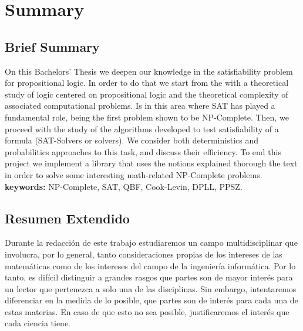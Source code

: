 
\newpage



\chapter*{Summary}
\section*{Brief Summary}

On this Bachelors' Thesis we deepen our knowledge in the satisfiability problem for propositional logic. In order to do that we start from the with a theoretical study of logic centered on propositional logic and the theoretical complexity of associated computational problems. Is in this area where SAT has played a fundamental role, being the first problem shown to be NP-Complete. Then, we proceed with the study of the algorithms developed to test satisfiability of a formula (SAT-Solvers or solvers). We consider both deterministics and probabilitics approaches to this task, and discuss their efficiency. To end this project we implement a library that uses the notions explained thorough the text in order to solve some interesting math-related NP-Complete problems.\\

\textbf{keywords:} NP-Complete, SAT, QBF, Cook-Levin, DPLL, PPSZ.



\section*{Resumen Extendido}

Durante la redacción de este trabajo estudiaremos un campo multidisciplinar que involucra, por lo general, tanto consideraciones propias de los intereses de las matemáticas como de los intereses del campo de la ingeniería informática. Por lo tanto, es difícil distinguir a grandes rasgos que partes son de mayor interés para un lector que pertenezca a solo una de las disciplinas. Sin embargo, intentaremos diferenciar en la medida de lo posible, que partes son de interés para cada una de estas materias. En caso de que esto no sea posible, justificaremos el interés que cada ciencia tiene.\\

